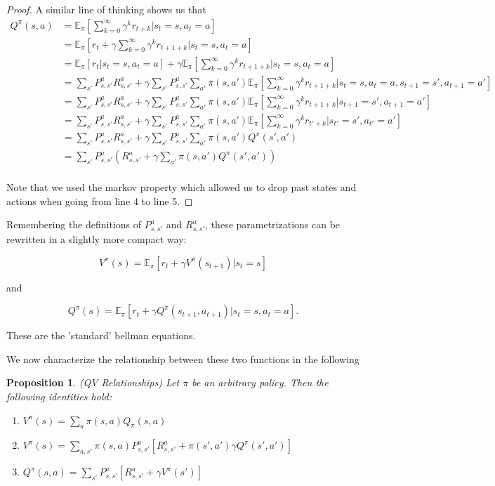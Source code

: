 \documentclass[11pt]{article} %
\newtheorem{prop}{Proposition}
\begin{document}
\begin{proof}
A similar line of thinking shows us that
	\[
		\begin{array}{rl}
			Q^{\pi}(s,a)	& = \mathbb{E}_{\pi}[\sum_{k=0}^{\infty} \gamma^k r_{t+k} | s_t = s, a_t = a]  \\
						& = \mathbb{E}_{\pi}[r_t + \gamma \sum_{k=0}^{\infty} \gamma^k r_{t+1+k} | s_t = s, a_t = a]  \\
						& = \mathbb{E}_{\pi}[r_t | s_t = s, a_t = a] + \gamma \mathbb{E}_{\pi}[ \sum_{k=0}^{\infty} \gamma^k r_{t+1+k} | s_t = s, a_t = a] \\
						& = \sum_{s'} P_{s,s'}^a R_{s,s'}^a + \gamma \sum_{s'} P_{s,s'}^a \sum_{a'} \pi(s,a') \mathbb{E}_{\pi}[\sum_{k=0}^{\infty} \gamma^k r_{t+1+k} | s_t = s, a_t = a, s_{t+1} = s', a_{t+1} = a'] \\
						& = \sum_{s'} P_{s,s'}^a R_{s,s'}^a + \gamma \sum_{s'} P_{s,s'}^a \sum_{a'} \pi(s,a') \mathbb{E}_{\pi}[\sum_{k=0}^{\infty} \gamma^k r_{t+1+k} | s_{t+1} = s', a_{t+1} = a'] \\
						& = \sum_{s'} P_{s,s'}^a R_{s,s'}^a + \gamma \sum_{s'} P_{s,s'}^a \sum_{a'} \pi(s,a') \mathbb{E}_{\pi}[\sum_{k=0}^{\infty} \gamma^k r_{t'+k} | s_{t'} = s', a_{t'} = a'] \\
						& = \sum_{s'} P_{s,s'}^a R_{s,s'}^a + \gamma \sum_{s'} P_{s,s'}^a \sum_{a'} \pi(s,a') Q^{\pi}(s',a') \\
						& = \sum_{s'} P_{s,s'}^a ( R_{s,s'}^a + \gamma \sum_{a'} \pi(s,a') Q^{\pi}(s',a') )  \\
		\end{array}
	\]

Note that we used the markov property which allowed us to drop past states and actions when going from line 4 to line 5.

\end{proof}

Remembering the definitions of $P_{s,s'}^a$ and $R_{s,s'}^a$, these parametrizations can be rewritten in a slightly more compact way:

$$ V^{\pi}(s) =  \mathbb{E}_{\pi}[r_t + \gamma V^{\pi}(s_{t+1}) | s_t = s ] $$

and 

$$ Q^{\pi}(s) = \mathbb{E}_{\pi}[r_t + \gamma Q^{\pi}(s_{t+1},a_{t+1}) | s_t = s, a_t = a]. $$

These are the 'standard' bellman equations.

We now characterize the relationship between these two functions in the following

\begin{prop}{(QV Relationships)}
	Let $\pi$ be an arbitrary policy. Then the following identities hold:
	\begin{enumerate}
		\item $V^{\pi}(s) = \sum_a \pi(s,a) Q_{\pi}(s,a)$ \\
		\item $V^{\pi}(s) = \sum_{a,s'}  \pi(s,a) P_{s,s'}^a [ R_{s,s'}^a + \pi(s',a') \gamma Q^{\pi}(s',a')] $ \\
		\item $Q^{\pi}(s,a) = \sum_{s'} P_{s,s'}^a [ R_{s,s'}^a + \gamma V^{\pi}(s') ] $
	\end{enumerate}
\end{prop}
\end{document}
